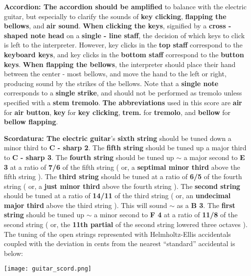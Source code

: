 \documentclass[12pt]{article}
\newcommand*\circled[1]{\tikz[baseline=(char.base)]{
            \node[shape=circle,draw,inner sep=1pt] (char) {#1};}}
\begin{document}
\begingroup
\textbf{Accordion: \circled{1} The accordion should be amplified} to balance with the electric guitar, but especially to clarify the sounds of \textbf{key clicking}, \textbf{flapping the bellows}, and \textbf{air sound}. \textbf{\circled{2} When clicking the keys}, signified by a \textbf{cross - shaped note head} on a \textbf{single - line staff}, the decision of which keys to click is left to the interpreter. However, key clicks in the \textbf{top staff} correspond to the \textbf{keyboard keys}, and key clicks in the \textbf{bottom staff} correspond to the \textbf{button keys}. \textbf{\circled{3} When flapping the bellows}, the interpreter should place their hand between the center - most bellows, and move the hand to the left or right, producing sound by the strikes of the bellows. Note that a \textbf{single note} corresponds to a \textbf{single strike}, and should not be performed as tremolo unless specified with a \textbf{stem tremolo}. \textbf{\circled{4} The abbreviations} used in this score are \textbf{air} for \textbf{air button}, \textbf{key} for \textbf{key clicking}, \textbf{trem.} for \textbf{tremolo}, and \textbf{bellow} for \textbf{bellow flapping}.
\endgroup

\begingroup
\textbf{Scordatura: \circled{1} The electric guitar}'s \textbf{sixth string} should be tuned down a minor third to \textbf{C - sharp 2}. The \textbf{fifth string} should be tuned up a major third to \textbf{C - sharp 3}. The \textbf{fourth string} should be tuned up $\sim$ a major second to \textbf{E 3} at a ratio of \textbf{7/6} of the fifth string ( or, a \textbf{septimal minor third} above the fifth string ). The \textbf{third string} should be tuned at a ratio of \textbf{6/5} of the fourth string ( or, a \textbf{just minor third} above the fourth string ). The \textbf{second string} should be tuned at a ratio of \textbf{14/11} of the third string ( or, an \textbf{undecimal major third} above the third string ). This will sound $\sim$ as a \textbf{B 3}. The \textbf{first string} should be tuned up $\sim$ a minor second to \textbf{F 4} at a ratio of \textbf{11/8} of the second string ( or, the \textbf{11th partial} of the second string lowered three octaves ). \\ \textbf{\circled{2}} The tuning of the open strings represented with Helmholtz-Ellis accidentals coupled with the deviation in cents from the nearest “standard” accidental is below:

\begin{center}
\texttt{[image: guitar\_scord.png]}
\end{center}
\end{document}
